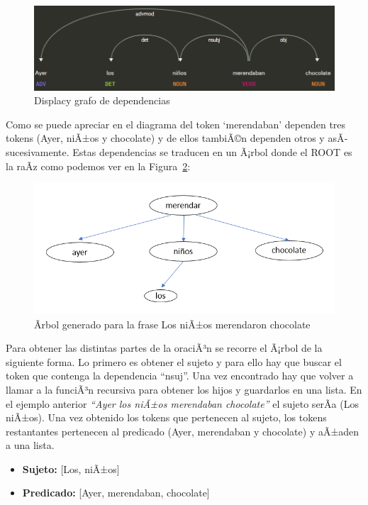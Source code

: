 \begin{figure}[h]
	\centering
	\includegraphics[width=1\textwidth]{Imagenes/Fuentes/Text2LSE/dependencias.png}
	\caption{ Displacy grafo de dependencias }
	\label {fig: dependencias}
\end{figure}


Como se puede apreciar en el diagrama del token `merendaban' dependen tres tokens (Ayer, niÃ±os y chocolate) y de ellos tambiÃ©n dependen otros y asÃ­ sucesivamente. Estas dependencias se traducen en un Ã¡rbol donde el ROOT es la raÃ­z como podemos ver en la Figura~\ref {fig: grafo}:\\


\begin{figure}[]
	\centering
	\includegraphics[width=1\textwidth]{Imagenes/Fuentes/Text2LSE/grafo.png}
	\caption{ Ãrbol generado para la frase Los niÃ±os merendaron chocolate }
	\label {fig: grafo}
\end{figure}


Para obtener las distintas partes de la oraciÃ³n se recorre el Ã¡rbol de la siguiente forma. Lo primero es obtener el sujeto y para ello hay que buscar el token que contenga la dependencia ``nsuj''. Una vez encontrado hay que volver a llamar a la funciÃ³n recursiva para obtener los hijos y guardarlos en una lista. En el ejemplo anterior \textit{``Ayer los niÃ±os merendaban chocolate''} el sujeto serÃ­a (Los niÃ±os). Una vez obtenido los tokens que pertenecen al sujeto, los tokens restantantes pertenecen al predicado (Ayer, merendaban y chocolate) y aÃ±aden a una lista.
\begin{center}
	\begin{itemize}
		\item \textbf{Sujeto:}  [Los, niÃ±os]
		\item \textbf{Predicado:} [Ayer, merendaban, chocolate]
		
	\end{itemize}
\end{center}
